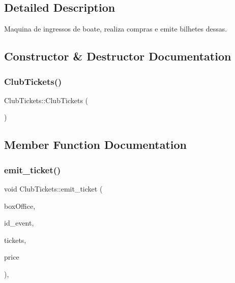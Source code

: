 \subsection{Detailed Description}
Maquina de ingressos de boate, realiza compras e emite bilhetes dessas. 

\subsection{Constructor \& Destructor Documentation}
\mbox{\label{class_club_tickets_a88dc2bfc85b1cb4f40ad67169c1e6898}} 
\subsubsection{\texorpdfstring{Club\+Tickets()}{ClubTickets()}}
{\footnotesize\ttfamily Club\+Tickets\+::\+Club\+Tickets (\begin{DoxyParamCaption}{ }\end{DoxyParamCaption})}



\subsection{Member Function Documentation}
\mbox{\label{class_club_tickets_ab4bc6e785c0b919923577ffc2e58042b}} 
\subsubsection{\texorpdfstring{emit\+\_\+ticket()}{emit\_ticket()}}
{\footnotesize\ttfamily void Club\+Tickets\+::emit\+\_\+ticket (\begin{DoxyParamCaption}\item[{\hyperlink{class_box_office}{Box\+Office} $\ast$}]{box\+Office,  }\item[{int}]{id\+\_\+event,  }\item[{int}]{tickets,  }\item[{int}]{price }\end{DoxyParamCaption})\hspace{0.3cm}{\ttfamily [override]}, {\ttfamily [virtual]}}



